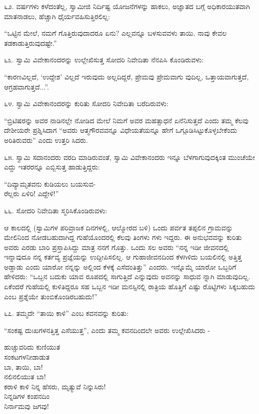 ೬೨. ವರ್ಷಗಳು ಕಳೆದಂತೆಲ್ಲ, ಸ್ವಾಮೀಜಿ ನಿರ್ದಿಷ್ಟ ಯೋಜನೆಗಳನ್ನು ಹಾಕಲು, ಅಜ್ಞಾತದ ಬಗ್ಗೆ ಅಧಿಕಾರಯುತವಾಗಿ ಮಾತನಾಡಲು, ಹೆಚ್ಚಾಗಿ ಧೈರ್ಯವಹಿಸುತ್ತಿರಲಿಲ್ಲ:

“ಒಟ್ಟಿನ ಮೇಲೆ, ನಮಗೆ ಗೊತ್ತಿರುವುದಾದರೂ ಏನು? ಎಲ್ಲವನ್ನೂ ಬಳಸುವವಳು ತಾಯಿ. ನಾವು ಕೇವಲ ತಡಕಾಡುತ್ತಿರುವುದಷ್ಟೇ.” 

೬೩. ಸ್ವಾಮಿ ವಿವೇಕಾನಂದರನ್ನು ಉಲ್ಲೇಖಿಸುತ್ತ ಸೋದರಿ ನಿವೇದಿತಾ ನೆನಪಿಸಿ ಕೊಂಡಿರುವಳು:

“ಕಾರಣವಿಲ್ಲದೆ, ‘ಉದ್ದೇಶ’ ವಿಲ್ಲದೆ ಇರುವುದು ಅಲ್ಲದಿದ್ದರೆ, ಪ್ರೇಮವು ಪ್ರೇಮವಾಗು ವುದಿಲ್ಲ, ಒತ್ತಾಯವಾಗುತ್ತದೆ, ಆಗ್ರಹವಾಗುತ್ತದೆ...”. 

೬೪. ಸ್ವಾಮಿ ವಿವೇಕಾನಂದರನ್ನು ಕುರಿತು ಸೋದರಿ ನಿವೇದಿತಾ ಬರೆದಿರುವಳು:

“ಬ್ರಿಟಿಷರನ್ನು ಅವರ ನಾಡಿನಲ್ಲೇ ನೋಡಿದ ಮೇಲೆ ನಿಮಗೆ ಅವರ ಮಹತ್ಸಾಧನೆ ಏನೆನಿಸುತ್ತದೆ ಎಂದು ತಮ್ಮ ಕೆಲವು ದೇಶೀಯರೇ ಪ್ರಶ್ನಿಸಿದಾಗ “ಅವರು ಆತ್ಮಗೌರವವನ್ನೂ ವಿಧೇಯತೆಯನ್ನೂ ಹೇಗೆ ಒಗ್ಗೂಡಿಸಿಟ್ಟುಕೊಳ್ಳಬೇಕೆಂದು ಅರಿತಿರುವರು” ಎಂದು ಉತ್ತರಿ ಸಿದರು. 

೬೫. ಸ್ವಾಮಿ ಸದಾನಂದರು ವರದಿ ಮಾಡಿರುವಂತೆ, ಸ್ವಾಮಿ ವಿವೇಕಾನಂದರು ಇನ್ನೂ ಬೆಳಗಾಗುವುದಕ್ಕಿಂತ ಮುಂಚೆಯೇ ಎದ್ದು ಇತರರನ್ನೂ ಎಬ್ಬಿಸುತ್ತ ಹಾಡುತ್ತಿದ್ದರು:

\begin{myquote}
“ದಿವ್ಯಾಮೃತವನು ಕುಡಿಯಲು ಬಯಸುವ-\\ರೆಲ್ಲರು ಏಳಿರಿ! ಎದ್ದೇಳಿ!” 
\end{myquote}

೬೬. ಸೋದರಿ ನಿವೇದಿತಾ ಸ್ಮರಿಸಿಕೊಂಡಿರುವಳು:

ಆ ಕಾಲದಲ್ಲಿ (ಸ್ವಾಮಿಗಳ ಪರಿವ್ರಾಜಕ ದಿನಗಳಲ್ಲಿ, ಆಲ್ಮೋರದ ಬಳಿ) ಒಂದು ಪರ್ವತ ತಪ್ಪಲಿನ ಗ್ರಾಮವನ್ನು ಮೇಲಿನಿಂದ ನೋಡಬಹುದಾಗಿದ್ದ ಗುಹೆಯೊಂದರಲ್ಲಿ ಕೆಲವು ತಿಂಗಳು ಗಳು ಇದ್ದರು. ಈ ಅನುಭವವನ್ನು ಕುರಿತು ಅವರು ಎರಡು ಬಾರಿ ಪ್ರಸ್ತಾಪಿಸಿದ್ದು ಮಾತ್ರ ನನಗೆ ಗೊತ್ತು. ಒಂದು ಸಲ ಅವರು “ನನ್ನ ಇಡೀ ಜೀವನದಲ್ಲಿ ಇನ್ನಾವುದೂ ನನ್ನ ಕರ್ತವ್ಯ ಪ್ರಜ್ಞೆಯನ್ನು ಉದ್ದೀಪಿಸಲಿಲ್ಲ. ಆ ಗುಹಾಜೀವನದಿಂದ ಕೆಳಗಿಳಿದು ಬಯಲಿನಲ್ಲಿ ಅತ್ತಿತ್ತ ಅಡ್ಡಾಡು ಎಂದು ಯಾರೋ ನನ್ನನ್ನು ಅಲ್ಲಿಂದ ಕೆಳಕ್ಕೆ ಎಸೆದಂತಿತ್ತು” ಎಂದರು. ಇನ್ನೊಮ್ಮೆ ಯಾರೋ ಒಬ್ಬರಿಗೆ ಹೇಳಿದರು: “ಒಬ್ಬನ ಬದುಕು ಯಾವ ರೂಪದಲ್ಲಿ ಸಾಗುತ್ತಿದೆ ಎನ್ನುವುದು ಅವನನ್ನು ಸಾಧುವ ನ್ನಾಗಿ ಮಾಡುವುದಿಲ್ಲ. ಏಕೆಂದರೆ ಗುಹೆಯಲ್ಲಿ ಕುಳಿತಿದ್ದರೂ ಸಹ ಒಬ್ಬನ ಇಡೀ ಮನಸ್ಸಿನಲ್ಲಿ ರಾತ್ರಿಯ ಹೊತ್ತಿಗೆ ಎಷ್ಟು ರೊಟ್ಟಿಗಳು ಸಿಕ್ಕಬಹುದು ಎಂಬ ಪ್ರಶ್ನೆಯೇ ತುಂಬಿಕೊಂಡಿರಬಹುದು!” 

೬೭. ತಮ್ಮದೇ “ತಾಯಿ ಕಾಳಿ” ಎಂಬ ಕವನವನ್ನು ಕುರಿತು:

“ಸಂಕಷ್ಟ ದುಃಖಗಳನತ್ತಿತ್ತ ಎಸೆಯುತ್ತ”, ಎಂದು ತಮ್ಮ ಕವನದಿಂದಲೇ ಅವರು ಉಲ್ಲೇಖಿಸಿದರು -

\begin{myquote}
ಹುಚ್ಚುವರಿದು ಕುಣಿಯುತ\\ಸಂಕಟಗಳನೀಡಾಡುತ\\ಬಾ, ತಾಯಿ, ಬಾ!\\ನಲಿನಲಿಯುತ ಬಾ!\\ಕರಾಳಿ ಕಾಳಿ ನಿನ್ನ ಹೆಸರು, ಮೃತ್ಯುವೆ ನಿನ್ನುಸಿರು!\\ನಿನ್ನಡಿಗಳ ಕಂಪನದಿಂ\\ನಿರ್ನಾಮವು ಜಗವು!
\end{myquote}


